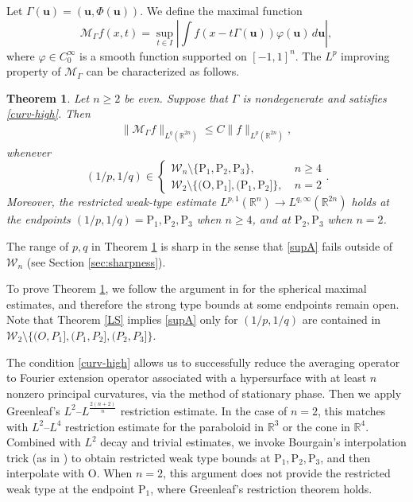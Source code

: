 \documentclass[10pt] %
{amsart}
\theoremstyle{plain}
\newtheorem{thm}{Theorem}[section]
\numberwithin{equation}{section}
\newcommand{\R}{\mathbb R}
\begin{document}
Let $\Gamma(\mathbf u) = (\mathbf u,  \Phi(\mathbf u))$. We define the maximal function 
\[ 
\mathcal M_\Gamma f(x,t)=\sup_{t \in I } \left| \int f(x-t\Gamma(\mathbf u) )\varphi(\mathbf u)\,d\mathbf u \right|,
\]
where  $\varphi\in C_0^\infty$ is a smooth function supported on $[-1,1]^n$.
The $L^p$ improving property of $\mathcal M_\Gamma$ can be characterized as follows. 

\begin{thm}\label{n-dim-thm}
Let $n\ge 2 $ be even.
Suppose that $\Gamma$ is nondegenerate and  satisfies \eqref{curv-high}.
Then 
\begin{align}\label{supA}
\big\| \mathcal M_\Gamma f\big\|_{L^q(\mathbb R^{2n})} \le  C\|f\|_{L^p(\mathbb R^{2n})}, 
\end{align}
whenever \[ \, (1/p,1/q)\in \begin{cases}   \mathcal W_n \setminus\{\mathrm P_1, \mathrm P_2, \mathrm P_3\}, &~  n \ge 4  \\   \mathcal W_2 \setminus  \{ (\mathrm O, \mathrm P_1], (\mathrm P_1, \mathrm P_2] \}, &~  n=2\end{cases}.\]
Moreover, the restricted weak-type estimate $L^{p,1}(\R^n) \to L^{q,\infty}(\R^{2n})$ 
holds at the endpoints $(1/p,1/q) = \mathrm P_1, \mathrm P_2, \mathrm P_3$ when $n\ge4$, and at $\mathrm P_2,\mathrm P_3$ when $n=2$.
\end{thm}


The range of $p,q$ in Theorem \ref{n-dim-thm} is sharp in the sense that \eqref{supA} fails outside of $\mathcal W_n$ (see Section \ref{sec:sharpness}). 

To prove Theorem \ref{n-dim-thm}, we follow the argument in \cite{Lee} for the spherical maximal estimates, and therefore the strong type bounds at some endpoints remain open. 
Note that Theorem \ref{LS} implies \eqref{supA} only for $(1/p,1/q)$ are contained in $\mathcal W_2\setminus\{(O,P_1],(P_1,P_2],(P_2,P_3]\}$.

The condition \eqref{curv-high} allows us to successfully  reduce the averaging operator to Fourier extension operator associated with a hypersurface with at least $n$ nonzero principal curvatures, via the method of stationary phase. 
Then we apply Greenleaf's $L^2$--$L^{\frac{2(n+2)}{n}}$ restriction estimate.
In the case of $n=2$, this matches with  $L^2$--$L^4$ restriction estimate for the paraboloid in $\mathbb R^3$ or the cone in $\mathbb R^4$.
Combined with $L^2$ decay and trivial estimates, we invoke Bourgain's interpolation trick (as in \cite{Lee}) to obtain restricted weak type bounds at $\mathrm P_1, \mathrm P_2, \mathrm P_3$, and then interpolate with $\mathrm O$.
When $n=2$, this argument does not provide the restricted weak type at the endpoint $\mathrm P_1$, where   Greenleaf's restriction theorem holds. 
  
\end{document}
